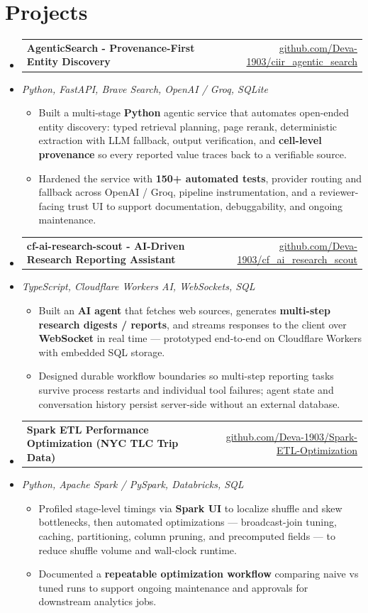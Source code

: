 \documentclass[letterpaper,10pt]{article}
\makeatletter
\newcommand{\resumeItem}[1]{
  \item\small{#1\vspace{-1pt}}
}
\newcommand{\resumeProjectHeading}[2]{
    \item
    \begin{tabular*}{0.985\textwidth}[t]{l@{\extracolsep{\fill}}r}
      \small\textbf{#1} & \small #2 \\
    \end{tabular*}\vspace{-5pt}
}
\newcommand{\resumeProjectSubheading}[1]{
  \vspace{-2pt}\item[] {\small\textcolor{ResumeSlate}{\emph{#1}}}\vspace{-3pt}
}
\newcommand{\resumeSubHeadingListStart}{\begin{itemize}[leftmargin=0.0in, label={}, itemsep=2pt, topsep=2pt]}
\newcommand{\resumeSubHeadingListEnd}{\end{itemize}}
\newcommand{\resumeItemListStart}{\begin{itemize}[leftmargin=0.18in, itemsep=2pt, topsep=1pt]}
\newcommand{\resumeItemListEnd}{\end{itemize}\vspace{-4pt}}
\makeatother
\begin{document}
\section{Projects}
\resumeSubHeadingListStart
  \resumeProjectHeading
    {AgenticSearch - Provenance-First Entity Discovery}
    {\href{https://github.com/Deva-1903/ciir_agentic_search}{github.com/Deva-1903/ciir\_agentic\_search}}
  \resumeProjectSubheading{Python, FastAPI, Brave Search, OpenAI / Groq, SQLite}
    \resumeItemListStart
      \resumeItem{Built a multi-stage \textbf{Python} agentic service that automates open-ended entity discovery: typed retrieval planning, page rerank, deterministic extraction with LLM fallback, output verification, and \textbf{cell-level provenance} so every reported value traces back to a verifiable source.}
      \resumeItem{Hardened the service with \textbf{150+ automated tests}, provider routing and fallback across OpenAI / Groq, pipeline instrumentation, and a reviewer-facing trust UI to support documentation, debuggability, and ongoing maintenance.}
    \resumeItemListEnd
  \resumeProjectHeading
    {cf-ai-research-scout - AI-Driven Research Reporting Assistant}
    {\href{https://github.com/Deva-1903/cf_ai_research_scout}{github.com/Deva-1903/cf\_ai\_research\_scout}}
  \resumeProjectSubheading{TypeScript, Cloudflare Workers AI, WebSockets, SQL}
    \resumeItemListStart
      \resumeItem{Built an \textbf{AI agent} that fetches web sources, generates \textbf{multi-step research digests / reports}, and streams responses to the client over \textbf{WebSocket} in real time --- prototyped end-to-end on Cloudflare Workers with embedded SQL storage.}
      \resumeItem{Designed durable workflow boundaries so multi-step reporting tasks survive process restarts and individual tool failures; agent state and conversation history persist server-side without an external database.}
    \resumeItemListEnd
  \resumeProjectHeading
    {Spark ETL Performance Optimization (NYC TLC Trip Data)}
    {\href{https://github.com/Deva-1903/Spark-ETL-Optimization}{github.com/Deva-1903/Spark-ETL-Optimization}}
  \resumeProjectSubheading{Python, Apache Spark / PySpark, Databricks, SQL}
    \resumeItemListStart
      \resumeItem{Profiled stage-level timings via \textbf{Spark UI} to localize shuffle and skew bottlenecks, then automated optimizations --- broadcast-join tuning, caching, partitioning, column pruning, and precomputed fields --- to reduce shuffle volume and wall-clock runtime.}
      \resumeItem{Documented a \textbf{repeatable optimization workflow} comparing naive vs tuned runs to support ongoing maintenance and approvals for downstream analytics jobs.}
    \resumeItemListEnd
\resumeSubHeadingListEnd
\vspace{-4pt}
\end{document}
